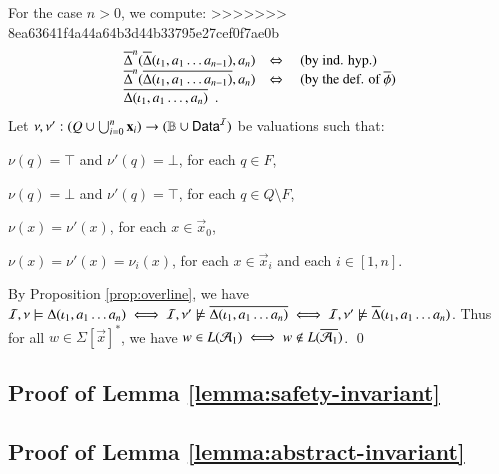 \documentclass[10pt,conference,letterpaper,twocolumn]{IEEEtran}
\begin{document}
{  For the case $n>0$, we compute:
>>>>>>> 8ea63641f4a44a64b3d44b33795e27cef0f7ae0b
  \[\begin{array}{lcl}
  \overline{\Delta}^n(\overline{\Delta}(\iota_1,a_1\ldots a_{n-1}),a_n) & \Leftrightarrow & \text{ (by ind. hyp.)} \\
  \overline{\Delta}^n(\overline{\Delta(\iota_1,a_1\ldots a_{n-1})},a_n) & \Leftrightarrow & \text{ (by the def. of $\overline{\phi}$)} \\
  \overline{\Delta(\iota_1,a_1\ldots,a_n)} \enspace.
  \end{array}\]
  Let $\nu,\nu' : (Q \cup \bigcup_{i=0}^n\mathbf x_i) \rightarrow (\mathbb{B}
  \cup \mathsf{Data}^{\mathcal{I}})$ be valuations such that: \begin{compactitem}
  \item $\nu(q) = \top$ and $\nu'(q) = \bot$, for each $q \in F$, 
  \item $\nu(q) = \bot$ and $\nu'(q) = \top$, for each $q \in Q \setminus F$, 
  \item $\nu(x) = \nu'(x)$, for each $x \in \vec{x}_0$, 
  \item $\nu(x) = \nu'(x) = \nu_i(x)$, for each $x \in \vec{x}_i$ and each $i
    \in [1,n]$.
  \end{compactitem}
  By Proposition \ref{prop:overline}, we have $\mathcal{I},\nu \models
  \Delta(\iota_1,a_1 \ldots a_n) \iff \mathcal{I},\nu' \not\models
  \overline{\Delta(\iota_1,a_1 \ldots a_n)} \iff \mathcal{I},\nu' \not\models
  \overline{\Delta}(\iota_1,a_1 \ldots a_n)$. Thus for all $w \in
  \Sigma[\vec{x}]^*$, we have $w \in L(\mathcal{A}_1) \iff w \not\in
  L(\overline{\mathcal{A}_1})$. \qed}

\subsection{Proof of Lemma \ref{lemma:safety-invariant}}


\subsection{Proof of Lemma \ref{lemma:abstract-invariant}}
\end{document}
